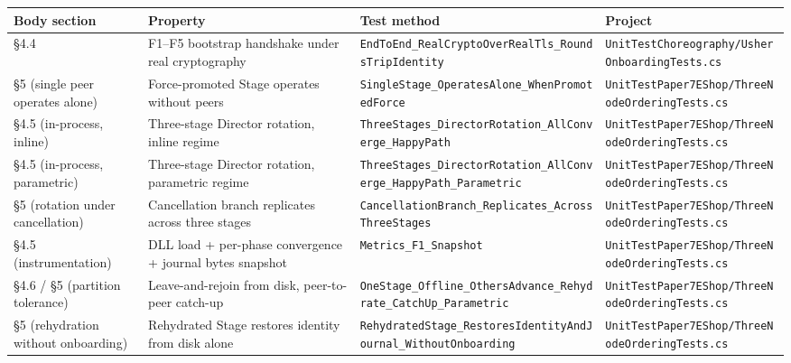 \documentclass[
]{article}
\newcounter{none} %
\begin{document}
{\def\LTcaptype{none} %
\begin{longtable}[]{@{}
  >{\raggedright\arraybackslash}p{}
  >{\raggedright\arraybackslash}p{}
  >{\raggedright\arraybackslash}p{}
  >{\raggedright\arraybackslash}p{}@{}}
\toprule\noalign{}
\begin{minipage}[b]{\linewidth}\raggedright
Body section
\end{minipage} & \begin{minipage}[b]{\linewidth}\raggedright
Property
\end{minipage} & \begin{minipage}[b]{\linewidth}\raggedright
Test method
\end{minipage} & \begin{minipage}[b]{\linewidth}\raggedright
Project
\end{minipage} \\
\midrule\noalign{}
\endhead
\bottomrule\noalign{}
\endlastfoot
§4.4 & F1--F5 bootstrap handshake under real cryptography &
\texttt{EndToEnd\_RealCryptoOverRealTls\_RoundsTripIdentity} &
\texttt{UnitTestChoreography/UsherOnboardingTests.cs} \\
§5 (single peer operates alone) & Force-promoted Stage operates without
peers & \texttt{SingleStage\_OperatesAlone\_WhenPromotedForce} &
\texttt{UnitTestPaper7EShop/ThreeNodeOrderingTests.cs} \\
§4.5 (in-process, inline) & Three-stage Director rotation, inline regime
& \texttt{ThreeStages\_DirectorRotation\_AllConverge\_HappyPath} &
\texttt{UnitTestPaper7EShop/ThreeNodeOrderingTests.cs} \\
§4.5 (in-process, parametric) & Three-stage Director rotation,
parametric regime &
\texttt{ThreeStages\_DirectorRotation\_AllConverge\_HappyPath\_Parametric}
& \texttt{UnitTestPaper7EShop/ThreeNodeOrderingTests.cs} \\
§5 (rotation under cancellation) & Cancellation branch replicates across
three stages &
\texttt{CancellationBranch\_Replicates\_AcrossThreeStages} &
\texttt{UnitTestPaper7EShop/ThreeNodeOrderingTests.cs} \\
§4.5 (instrumentation) & DLL load + per-phase convergence + journal
bytes snapshot & \texttt{Metrics\_F1\_Snapshot} &
\texttt{UnitTestPaper7EShop/ThreeNodeOrderingTests.cs} \\
§4.6 / §5 (partition tolerance) & Leave-and-rejoin from disk,
peer-to-peer catch-up &
\texttt{OneStage\_Offline\_OthersAdvance\_Rehydrate\_CatchUp\_Parametric}
& \texttt{UnitTestPaper7EShop/ThreeNodeOrderingTests.cs} \\
§5 (rehydration without onboarding) & Rehydrated Stage restores identity
from disk alone &
\texttt{RehydratedStage\_RestoresIdentityAndJournal\_WithoutOnboarding}
& \texttt{UnitTestPaper7EShop/ThreeNodeOrderingTests.cs} \\
\end{longtable}
}
\end{document}
